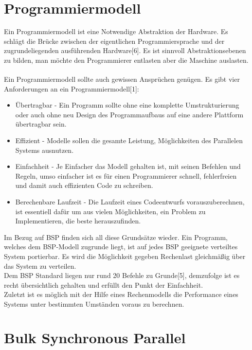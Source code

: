 \documentclass[a4paper,10pt]{scrartcl}
\begin{document}
\section{Programmiermodell}
Ein Programmiermodell ist eine Notwendige Abstraktion der Hardware. Es schlägt die Brücke zwischen der eigentlichen Programmiersprache und der zugrundeliegenden ausführenden Hardware[6]. Es ist sinnvoll Abstraktionsebenen zu bilden, man möchte den Programmierer entlasten aber die Maschine auslasten.
\\
\\
Ein Programmiermodell sollte auch gewissen Ansprüchen genügen. Es gibt vier Anforderungen an ein Programmiermodell[1]:
\begin{itemize}
\item Übertragbar - Ein Programm sollte ohne eine komplette Umstrukturierung oder auch ohne neu Design des Programmaufbaus auf eine andere Plattform übertragbar sein.
\item Effizient - Modelle sollen die gesamte Leistung, Möglichkeiten des Parallelen Systems ausnutzen.
\item Einfachheit - Je Einfacher das Modell gehalten ist, mit seinen Befehlen und Regeln, umso einfacher ist es für einen Programmierer schnell, fehlerfreien und damit auch effizienten Code zu schreiben.
\item Berechenbare Laufzeit - Die Laufzeit eines Codeentwurfs vorauszuberechnen, ist essentiell dafür um aus vielen Möglichkeiten, ein Problem zu Implementieren, die beste herauszufinden.
\end{itemize}
Im Bezug auf BSP finden sich all diese Grundsätze wieder. Ein Programm, welches dem BSP-Modell zugrunde liegt, ist auf jedes BSP geeignete verteiltes System portierbar. Es wird die Möglichkeit gegeben Rechenlast gleichmäßig über das System zu verteilen.\\
Dem BSP Standard liegen nur rund 20 Befehle zu Grunde[5], demzufolge ist es recht übersichtlich gehalten und erfüllt den Punkt der Einfachheit.\\ Zuletzt ist es möglich mit der Hilfe eines Rechenmodells die Performance eines Systems unter bestimmten Umständen voraus zu berechnen.
\newpage
 
\section{Bulk Synchronous Parallel}
\end{document}
